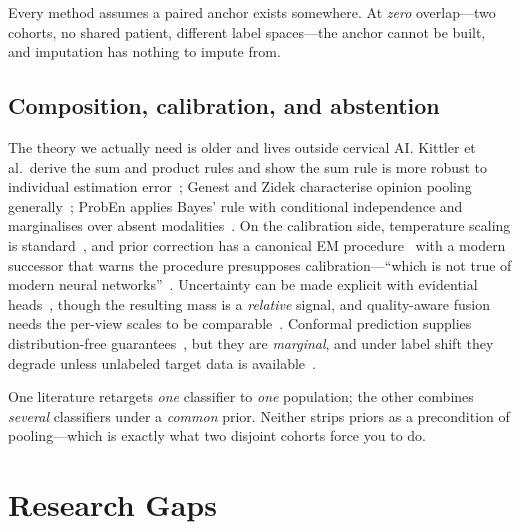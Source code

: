 \documentclass[sigplan,nonacm,screen]{acmart}
\begin{document}
\begin{gapbox}
Every method assumes a paired anchor exists somewhere. At \emph{zero} overlap---two cohorts, no shared patient, different label spaces---the anchor cannot be built, and imputation has nothing to impute from.
\end{gapbox}

\subsection{Composition, calibration, and abstention}
The theory we actually need is older and lives outside cervical AI. Kittler et al.\ derive the sum and product rules and show the sum rule is more robust to individual estimation error~\cite{kittler1998combining}; Genest and Zidek characterise opinion pooling generally~\cite{genest1986combining}; ProbEn applies Bayes' rule with conditional independence and marginalises over absent modalities~\cite{chen2022proben}. On the calibration side, temperature scaling is standard~\cite{guo2017calibration}, and prior correction has a canonical EM procedure~\cite{saerens2002adjusting} with a modern successor that warns the procedure presupposes calibration---``which is not true of modern neural networks''~\cite{alexandari2020maximum}. Uncertainty can be made explicit with evidential heads~\cite{sensoy2018evidential,han2021trusted,han2023trusted}, though the resulting mass is a \emph{relative} signal, and quality-aware fusion needs the per-view scales to be comparable~\cite{zhang2023provable}. Conformal prediction supplies distribution-free guarantees~\cite{angelopoulos2021gentle}, but they are \emph{marginal}, and under label shift they degrade unless unlabeled target data is available~\cite{podkopaev2021distribution}.

\begin{gapbox}
One literature retargets \emph{one} classifier to \emph{one} population; the other combines \emph{several} classifiers under a \emph{common} prior. Neither strips priors as a precondition of pooling---which is exactly what two disjoint cohorts force you to do.
\end{gapbox}

\section{Research Gaps}
\end{document}
